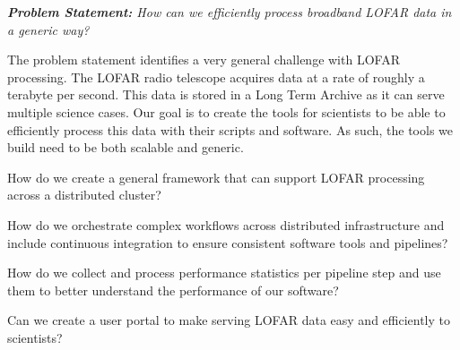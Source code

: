 \begin{addmargin}[4em]{8em}%
    \emph{\textbf{Problem Statement:} How can we efficiently process broadband LOFAR data in a generic way?} 
\end{addmargin}

The problem statement identifies a very general challenge with LOFAR processing. The LOFAR radio telescope acquires data at a rate of roughly a terabyte per second. This data is stored in a Long Term Archive as it can serve multiple science cases. Our goal is to create the tools for scientists to be able to efficiently process this data with their scripts and software. As such, the tools we build need to be both scalable and generic.   


How do we create a general framework that can support LOFAR processing across a distributed cluster?

How do we orchestrate complex workflows across distributed infrastructure and include continuous integration to ensure consistent software tools and pipelines?

How do we collect and process performance statistics per pipeline step and use them to better understand the performance of our software?

Can we create a user portal to make serving LOFAR data easy and efficiently to scientists?






